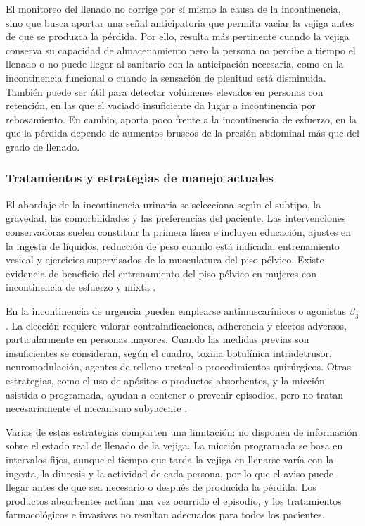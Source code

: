 \documentclass[12pt,a4paper]{article}
\begin{document}
El monitoreo del llenado no corrige por sí mismo la causa de la incontinencia, sino que busca aportar
una señal anticipatoria que permita vaciar la vejiga antes de que se produzca la pérdida. Por ello,
resulta más pertinente cuando la vejiga conserva su capacidad de almacenamiento pero la persona no
percibe a tiempo el llenado o no puede llegar al sanitario con la anticipación necesaria, como en la
incontinencia funcional o cuando la sensación de plenitud está disminuida. También puede ser útil para
detectar volúmenes elevados en personas con retención, en las que el vaciado insuficiente da lugar a
incontinencia por rebosamiento. En cambio, aporta poco frente a la incontinencia de esfuerzo, en la que
la pérdida depende de aumentos bruscos de la presión abdominal más que del grado de llenado.


\subsubsection{Tratamientos y estrategias de manejo actuales}

El abordaje de la incontinencia urinaria se selecciona según el subtipo, la gravedad, las comorbilidades y las preferencias del
paciente. Las intervenciones conservadoras suelen constituir la primera línea e incluyen educación,
ajustes en la ingesta de líquidos, reducción de peso cuando está indicada, entrenamiento vesical y
ejercicios supervisados de la musculatura del piso pélvico. Existe evidencia de beneficio del
entrenamiento del piso pélvico en mujeres con incontinencia de esfuerzo y mixta
\cite{eau2025femaleLUTS,dumoulin2018pelvic}.

En la incontinencia de urgencia pueden emplearse antimuscarínicos o agonistas $\beta_3$. La elección
requiere valorar contraindicaciones, adherencia y efectos adversos, particularmente en personas mayores.
Cuando las medidas previas son insuficientes se consideran, según el cuadro, toxina botulínica
intradetrusor, neuromodulación, agentes de relleno uretral o procedimientos quirúrgicos. Otras estrategias, como
el uso de apósitos o productos
absorbentes, y la micción asistida o programada, ayudan a contener o prevenir episodios, pero no tratan
necesariamente el mecanismo subyacente \cite{eau2025femaleLUTS}.

Varias de estas estrategias comparten una limitación: no disponen de información sobre el estado real
de llenado de la vejiga. La micción programada se basa en intervalos fijos, aunque el tiempo que tarda
la vejiga en llenarse varía con la ingesta, la diuresis y la actividad de cada persona, por lo que el
aviso puede llegar antes de que sea necesario o después de producida la pérdida. Los productos
absorbentes actúan una vez ocurrido el episodio, y los tratamientos farmacológicos e invasivos no
resultan adecuados para todos los pacientes.
\end{document}
